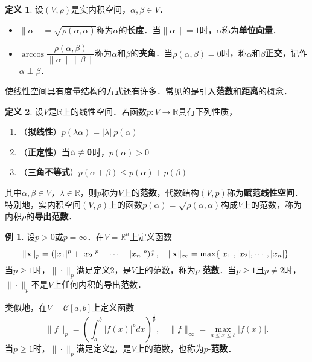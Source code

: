 \documentclass[a4paper,fontset=windows]{ctexbook}
\theoremstyle{definition}
\newtheorem{definition}{定义}[chapter]
\newtheorem{example}{例}[chapter]
\renewcommand{\le}{\leqslant}
\renewcommand{\ge}{\geqslant}
\begin{document}
\begin{definition}
设$(V,\rho)$是实内积空间，$\alpha,\beta\in V$．
\begin{itemize}
\item $\|\alpha\|=\sqrt{\rho(\alpha,\alpha)}$称为$\alpha$的{\bf 长度}．当$\|\alpha\|=1$时，$\alpha$称为{\bf 单位向量}．

\item $\arccos\dfrac{\rho(\alpha,\beta)}{\|\alpha\|\,\|\beta\|}$称为$\alpha$和$\beta$的{\bf 夹角}．当$\rho(\alpha,\beta)=0$时，称$\alpha$和$\beta${\bf 正交}，记作$\alpha\perp\beta$．
\end{itemize}
\end{definition}

使线性空间具有度量结构的方式还有许多．常见的是引入{\bf 范数}和{\bf 距离}的概念．

\begin{definition}\label{def10.4}
设$V$是$\mathbb{R}$上的线性空间．若函数$p:V\to\mathbb{R}$具有下列性质，
\begin{enumerate}
\item（{\bf 拟线性}）$p(\lambda\alpha)=|\lambda|~p(\alpha)$

\item（{\bf 正定性}）当$\alpha\ne{\bf 0}$时，$p(\alpha)>0$

\item（{\bf 三角不等式}）$p(\alpha+\beta)\le p(\alpha)+p(\beta)$
\end{enumerate}
其中$\alpha,\beta\in V$，$\lambda\in\mathbb{R}$，则$p$称为$V$上的{\bf 范数}，代数结构$(V,p)$称为{\bf 赋范线性空间}．特别地，实内积空间$(V,\rho)$上的函数$p(\alpha)=\sqrt{\rho(\alpha,\alpha)}$构成$V$上的范数，称为内积$\rho$的{\bf 导出范数}．
\end{definition}

\begin{example}\label{ex10.8}
设$p>0$或$p=\infty$．在$V=\mathbb{R}^n$上定义函数
$$\|{\bf x}\|_p=(|x_1|^p+|x_2|^p+\cdots+|x_n|^p)^{\frac{1}{p}},\quad\|{\bf x}\|_\infty=\max\{|x_1|,|x_2|,\cdots,|x_n|\}.$$
当$p\ge 1$时，$\|\cdot\|_p$满足定义\ref{def10.4}，是$V$上的范数，称为$p$-{\bf 范数}．当$p\ge 1$且$p\ne 2$时，$\|\cdot\|_p$不是$V$上任何内积的导出范数．

类似地，在$V=\mathscr{C}[a,b]$上定义函数
$$\|f\|_p=\left(\int_a^b|f(x)|^pdx\right)^{\frac{1}{p}},\quad\|f\|_\infty=\max_{a\le x\le b}|f(x)|.$$
当$p\ge 1$时，$\|\cdot\|_p$满足定义\ref{def10.4}，是$V$上的范数，也称为$p$-{\bf 范数}．
\end{example}
\end{document}
